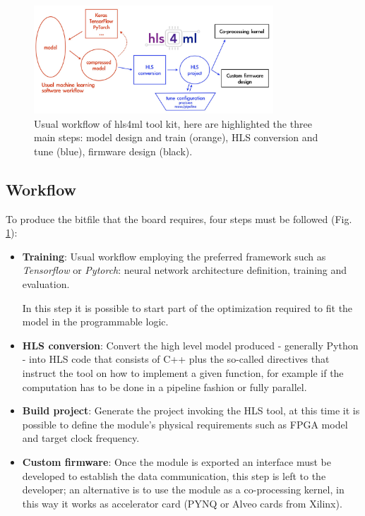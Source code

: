 \documentclass[../../main.tex]{subfiles}
\begin{document}
\begin{figure}[h]
    \centering
    \includegraphics[width=0.8\textwidth]{sections/04/Images/hls4ml_workflow.jpg}
    \caption{Usual workflow of hls4ml tool kit, here are highlighted the three main steps: model design and train (orange), HLS conversion and tune (blue), firmware design (black).}
    \label{fig:hls4ml}
\end{figure}

\subsection{Workflow}
\label{sec:FPGA_hls4ml_workflow}

To produce the bitfile that the board requires, four steps must be followed (Fig. \ref{fig:hls4ml}):
\begin{itemize}
    \item \textbf{Training}: Usual workflow employing the preferred framework such as \textit{Tensorflow} or \textit{Pytorch}: neural network architecture definition, training and evaluation.  
    
    In this step it is possible to start part of the optimization required to fit the model in the programmable logic.
    \item \textbf{HLS conversion}: Convert the high level model produced - generally Python - into HLS code that consists of C++ plus the so-called directives that instruct the tool on how to implement a given function, for example if the computation has to be done in a pipeline fashion or fully parallel.  
    \item \textbf{Build project}: Generate the project invoking the HLS tool, at this time it is possible to define the module's physical requirements such as FPGA model and target clock frequency.  
    \item \textbf{Custom firmware}: Once the module is exported an interface must be developed to establish the data communication, this step is left to the developer; an alternative is to use the module as a co-processing kernel, in this way it works as accelerator card (PYNQ or Alveo cards from Xilinx).
    
\end{itemize}
\end{document}
